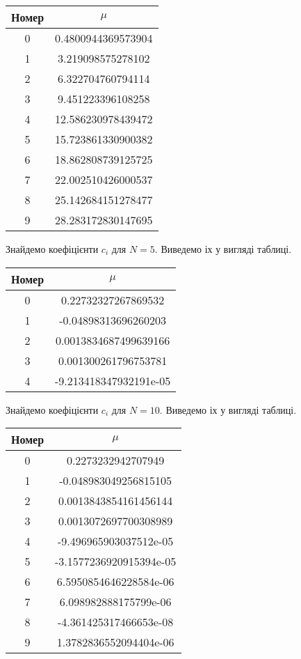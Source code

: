 \documentclass[14pt,a4paper]{scrartcl}
\begin{document}
	
	\begin{center}
		\begin{tabular}{ | c | c | }
			\hline
			Номер & $\mu$ \\ \hline
			0 & 0.4800944369573904 \\
			1 & 3.219098575278102 \\
			2 & 6.322704760794114 \\
			3 & 9.451223396108258 \\
			4 & 12.586230978439472 \\
			5 & 15.723861330900382 \\
			6 & 18.862808739125725 \\
			7 & 22.002510426000537 \\
			8 & 25.142684151278477 \\
			9 & 28.283172830147695 \\
			\hline
		\end{tabular}
	\end{center}
	
	Знайдемо коефіцієнти $c_i$ для $N=5$. Виведемо іх у вигляді таблиці.
	
	\begin{center}
		\begin{tabular}{ | c | c | }
			\hline
			Номер & $\mu$ \\ \hline
			0 & 0.22732327267869532 \\
			1 & -0.04898313696260203 \\
			2 & 0.0013834687499639166 \\
			3 & 0.001300261796753781 \\
			4 & -9.213418347932191e-05 \\
			\hline
		\end{tabular}
	\end{center}

	Знайдемо коефіцієнти $c_i$ для $N=10$. Виведемо іх у вигляді таблиці.
	
		\begin{center}
		\begin{tabular}{ | c | c | }
			\hline
			Номер & $\mu$ \\ \hline
			0 & 0.2273232942707949 \\
			1 & -0.048983049256815105 \\
			2 & 0.0013843854161456144 \\
			3 & 0.0013072697700308989 \\
			4 & -9.496965903037512e-05 \\
			5 & -3.1577236920915394e-05 \\
			6 & 6.5950854646228584e-06 \\
			7 & 6.098982888175799e-06 \\
			8 & -4.361425317466653e-08 \\
			9 & 1.3782836552094404e-06 \\
			\hline
		\end{tabular}
	\end{center}
\end{document}
